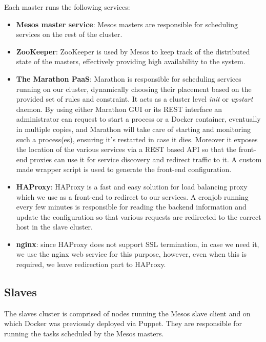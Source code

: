 \documentclass[a4paper]{jpconf}
\begin{document}
Each master runs the following services:

\begin{itemize}

\item \textbf{Mesos master service}: Mesos masters are responsible for
scheduling services on the rest of the cluster.

\item \textbf{ZooKeeper}: ZooKeeper is used by Mesos to keep track of the
distributed state of the masters, effectively providing high availability to the
system.

\item \textbf{The Marathon PaaS}: Marathon is responsible for scheduling
services running on our cluster, dynamically choosing their placement based on
the provided set of rules and constraint. It acts as a cluster level
\textit{init} or \textit{upstart} daemon.  By using either Marathon GUI or its
REST interface an administrator can request to start a process or a Docker
container, eventually in multiple copies, and Marathon will take care of
starting and monitoring such a process(es), ensuring it's restarted in case it
dies. Moreover it exposes the location of the various services via a REST based
API so that the front-end proxies can use it for service discovery and redirect
traffic to it. A custom made wrapper script is used to generate the front-end
configuration.

\item \textbf{HAProxy}: HAProxy is a fast and easy solution for load balancing
proxy which we use as a front-end to redirect to our services. A cronjob running
every few minutes is responsible for reading the backend information and update
the configuration so that various requests are redirected to the correct host in
the slave cluster.

\item \textbf{nginx}: since HAProxy does not support SSL termination, in case we
need it, we use the nginx web service for this purpose, however, even when this
is required, we leave redirection part to HAProxy.

\end{itemize}

\subsection{Slaves}

The slaves cluster is comprised of nodes running the Mesos slave client and on
which Docker was previously deployed via Puppet. They are responsible for
running the tasks scheduled by the Mesos masters.
\end{document}
